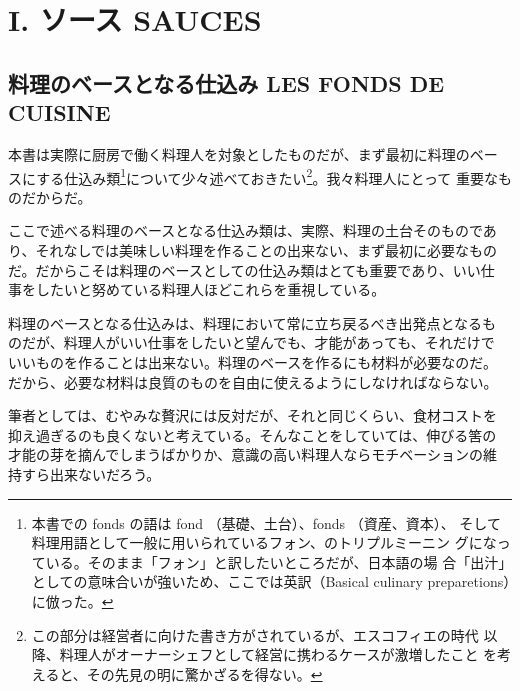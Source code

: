 \documentclass[twoside,12Q,b5paper,tombo]{escoffierltjsbook}
\date{}
\newenvironment{recette}{\begin{multicols}{2}}{\end{multicols}}
\renewcommand{\thesection}{}
\begin{document}





\chapter*{I. ソース SAUCES}\label{i.-ux30bdux30fcux30b9-sauces}

\section*{料理のベースとなる仕込み LES FONDS DE
CUISINE}\label{ux6599ux7406ux306eux30d9ux30fcux30b9ux3068ux306aux308bux4ed5ux8fbcux307f-les-fonds-de-cuisine}

本書は実際に厨房で働く料理人を対象としたものだが、まず最初に料理のベー
スにする仕込み類\footnote{本書での fonds の語は fond
  （基礎、土台）、fonds （資産、資本）、
  そして料理用語として一般に用いられているフォン、のトリプルミーニン
  グになっている。そのまま「フォン」と訳したいところだが、日本語の場
  合「出汁」としての意味合いが強いため、ここでは英訳（Basical culinary
  preparetions）に倣った。}について少々述べておきたい\footnote{この部分は経営者に向けた書き方がされているが、エスコフィエの時代
  以降、料理人がオーナーシェフとして経営に携わるケースが激増したこと
  を考えると、その先見の明に驚かざるを得ない。}。我々料理人にとって
重要なものだからだ。

ここで述べる料理のベースとなる仕込み類は、実際、料理の土台そのものであ
り、それなしでは美味しい料理を作ることの出来ない、まず最初に必要なもの
だ。だからこそは料理のベースとしての仕込み類はとても重要であり、いい仕
事をしたいと努めている料理人ほどこれらを重視している。

料理のベースとなる仕込みは、料理において常に立ち戻るべき出発点となるも
のだが、料理人がいい仕事をしたいと望んでも、才能があっても、それだけで
いいものを作ることは出来ない。料理のベースを作るにも材料が必要なのだ。
だから、必要な材料は良質のものを自由に使えるようにしなければならない。

筆者としては、むやみな贅沢には反対だが、それと同じくらい、食材コストを
抑え過ぎるのも良くないと考えている。そんなことをしていては、伸びる筈の
才能の芽を摘んでしまうばかりか、意識の高い料理人ならモチベーションの維
持すら出来ないだろう。
\end{document}
